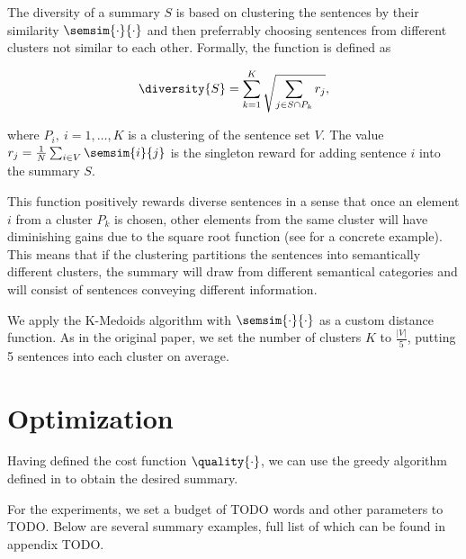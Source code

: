 The diversity of a summary $S$ is based on clustering the sentences by their similarity $\semsim{\cdot}{\cdot}$ and then preferrably choosing sentences from different clusters not similar to each other. Formally, the function is defined as

\begin{equation}
	\diversity{S} = \sum_{k = 1}^{K} \sqrt{\sum_{j \in S \cap P_{k}} r_{j}},
\end{equation}

where $P_{i},\ i = 1, \dots, K$ is a clustering of the sentence set $V$. The value $r_{j} = \frac{1}{N} \sum_{i \in V} \semsim{i}{j}$ is the singleton reward for adding sentence $i$ into the summary $S$.

This function positively rewards diverse sentences in a sense that once an element $i$ from a cluster $P_{k}$ is chosen, other elements from the same cluster will have diminishing gains due to the square root function (see \cite{multi-summarization-2} for a concrete example). This means that if the clustering partitions the sentences into semantically different clusters, the summary will draw from different semantical categories and will consist of sentences conveying different information.

We apply the K-Medoids algorithm with $\semsim{\cdot}{\cdot}$ as a custom distance function. As in the original paper, we set the number of clusters $K$ to $\frac{\left| V \right|}{5}$, putting 5 sentences into each cluster on average.


\section{Optimization}
Having defined the cost function $\quality{\cdot}$, we can use the greedy algorithm defined in \cite{multi-summarization-1} to obtain the desired summary.

For the experiments, we set a budget of {\color{red} TODO} words and other parameters to {\color{red} TODO}. Below are several summary examples, full list of which can be found in appendix {\color{red} TODO}.